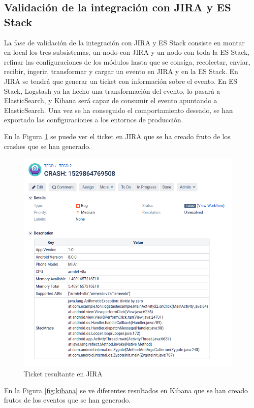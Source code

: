 \subsection{Validación de la integración con JIRA y ES Stack}
La fase de validación de la integración con JIRA y ES Stack consiste en montar en local los tres subsistemas, un nodo con JIRA y un nodo con toda la ES Stack, refinar las configuraciones de los módulos hasta que se consiga, recolectar, enviar, recibir, ingerir, transformar y cargar un evento en JIRA y en la ES Stack. En JIRA se tendrá que generar un ticket con información sobre el evento. En ES Stack, Logstash ya ha hecho una transformación del evento, lo pasará a ElasticSearch, y Kibana será capaz de consumir el evento apuntando a ElasticSearch. Una vez se ha conseguido el comportamiento deseado, se han exportado las configuraciones a los entornos de producción.

En la Figura \ref{fig:jira} se puede ver el ticket en JIRA que se ha creado fruto de los crashes que se han generado.

\begin{figure}[H]
	\centering
	\includegraphics[scale=0.4] {jira.png}
	\caption{Ticket resultante en JIRA}
	\label{fig:jira}
\end{figure}

En la Figura \ref{fig:kibana} se ve diferentes resultados en Kibana que se han creado frutos de los eventos que se han generado.

